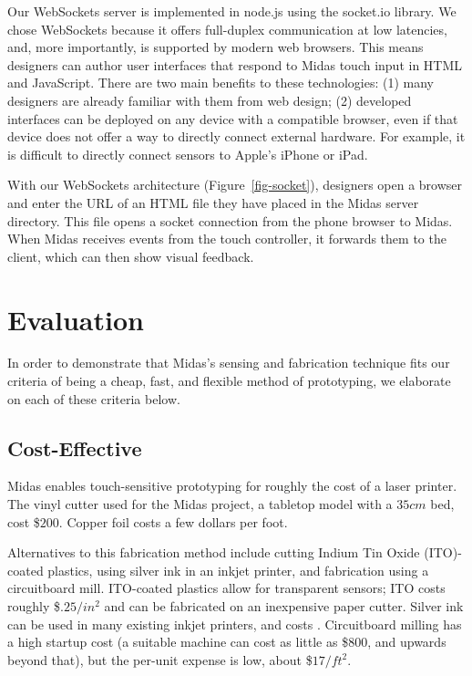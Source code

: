 Our WebSockets server is implemented in node.js using the socket.io library. We chose WebSockets because it offers full-duplex communication at low latencies, and, more importantly, is supported by modern web browsers. This means designers can author user interfaces that respond to Midas touch input in HTML and JavaScript. There are two main benefits to these technologies: (1) many designers are already familiar with them from web design; (2) developed interfaces can be deployed on any device with a compatible browser, even if that device does not offer a way to directly connect external hardware. For example, it is difficult to directly connect sensors to Apple's iPhone or iPad.

With our WebSockets architecture (Figure~\ref{fig-socket}), designers open a browser and enter the URL of an HTML file they have placed in the Midas server directory. This file opens a socket connection from the phone browser to Midas. When Midas receives events from the touch controller, it forwards them to the client, which can then show visual feedback.


\section{Evaluation}

    In order to demonstrate that Midas's sensing and fabrication technique fits our criteria of being a cheap, fast, and flexible method of prototyping, we elaborate on each of these criteria below.

    \subsection{Cost-Effective}
    
    Midas enables touch-sensitive prototyping for roughly the cost of a laser printer. The vinyl cutter used for the Midas project, a tabletop model with a $35cm$ bed, cost \$$200$. Copper foil costs a few dollars per foot.
    
    Alternatives to this fabrication method include cutting Indium Tin Oxide (ITO)-coated plastics, using silver ink in an inkjet printer, and fabrication using a circuitboard mill. ITO-coated plastics allow for transparent sensors; ITO costs roughly \$$.25/in^2$ and can be fabricated on an inexpensive paper cutter. Silver ink can be used in many existing inkjet printers, and costs . Circuitboard milling has a high startup cost (a suitable machine can cost as little as \$$800$, and upwards beyond that), but the per-unit expense is low, about \$$17/ft^2$.
    

